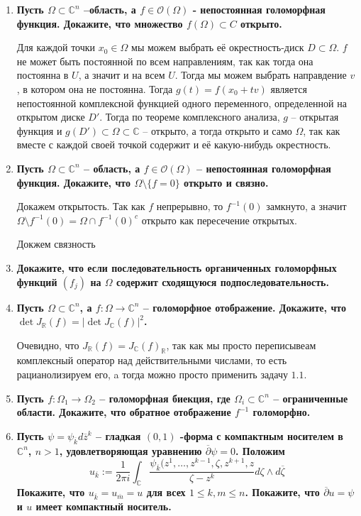 \documentclass{article}
\begin{document}
\begin{enumerate}
    \item \textbf{Пусть $\Omega\subset\mathbb C^n$ –область, а $f\in \mathcal O(\Omega)$
        - непостоянная голоморфная функция. Докажите, что множество $f(\Omega)⊂C$ открыто.}

        Для каждой точки $x_0\in\Omega$ мы можем выбрать её окрестность-диск $D\subset\Omega$.
        $f$ не может быть постоянной по всем направлениям, так как тогда она постоянна в
        $U$, а значит и на всем $U$. Тогда мы можем выбрать направдение $v$, в
        котором она не постоянна. Тогда $g(t)=f(x_0+tv)$ является непостоянной 
        комплексной функцией одного переменного, определенной на открытом диске
        $D'$. Тогда по теореме комплексного анализа, $g$ – открытая функция и 
        $g(D')\subset\Omega\subset\mathbb C$ – открыто, а тогда открыто и само $\Omega$,
        так как вместе с каждой своей точкой содержит и её какую-нибудь
        окрестность.

    \item \textbf{Пусть $\Omega\subset\mathbb C^n$ – область, а $f\in\mathcal O(\Omega)$
        – непостоянная голоморфная функция. Докажите, что $\Omega\setminus\{f=0\}$
        открыто и связно.}

        Докажем открытость. Так как $f$ непрерывно, то $f^{-1}(0)$ замкнуто, а
        значит $\Omega\setminus f^{-1}(0)=\Omega\cap f^{-1}(0)^c$ открыто как
        пересечение открытых.

        Докжем связность

    \item \textbf{Докажите, что если последовательность органиченных 
        голоморфных функций $(f_j)$ на $\Omega$ содержит сходящуюся 
        подпоследовательность.}

    \item \textbf{Пусть $\Omega\subset\mathbb C^n$, а $f:\Omega\rightarrow\mathbb
        C^n$ – голоморфное отображение. Докажите, что $\det J_{\mathbb R}(f)=
        |\det J_{\mathbb C}(f)|^2$.}

        Очевидно, что $J_{\mathbb R}(f)=J_{\mathbb C}(f)_{\mathbb R}$, так как 
        мы просто переписывеам комплексный оператор над действительными числами, 
        то есть рацианолизируем его, a тогда можно просто применить задачу $1.1$.

    \item \textbf{Пусть $f:\Omega_1\rightarrow\Omega_2$ – голоморфная биекция,
        где $\Omega_i\subset\mathbb C^n$ – ограниченные области. Докажите, что
        обратное отображение $f^{−1}$ голоморфно.}

    \item \textbf{Пусть $\psi=\psi_{\overline k}d\overline z^k$ – гладкая $(0,1)$
        -форма с компактным носителем в $\mathbb C^n$, $n>1$, удовлетворяющая
        уравнению $\overline ∂\psi=0$. Положим
        \[
            u_{\overline k} := \frac{1}{2πi}\int_{\mathbb C}\frac{\psi_{\overline k}
            (z^1,\ldots,z^{k-1},\zeta,z^{k+1},z}{\zeta-z^k}d\zeta\wedge d\overline\zeta
        \]
    Покажите, что $u_{\overline k}=u_{\overline m} = u$ для всех $1\leq k,m\leq n$.
    Покажите, что $\overline\partial u=\psi$ и $u$ имеет компактный носитель.}

\end{enumerate}
\end{document}
